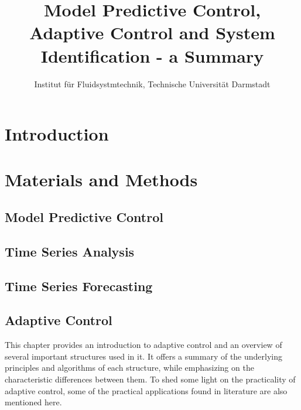 \documentclass[9pt, twoside]{article}
\begin{document}
\title {Model Predictive Control, Adaptive Control and System Identification - a Summary}

\author{Institut für Fluidsystmtechnik, Technische Universität Darmstadt}
\maketitle

\begin{abstract}
\end{abstract}

\begin{multicols}{2}
\section{Introduction}

\section{Materials and Methods}

\subsection{Model Predictive Control}

\subsection{Time Series Analysis}

\subsection{Time Series Forecasting}
\subsection{Adaptive Control}
This chapter provides an introduction to adaptive control and an overview of several important structures used in it. It offers a summary of the underlying principles and algorithms of each structure, while emphasizing on the characteristic differences between them. To shed some light on the practicality of adaptive control, some of the practical applications found in literature are also mentioned here.\\

\end{multicols}
\end{document}
